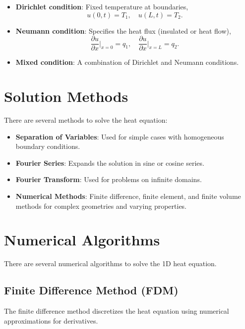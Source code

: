 \begin{itemize}
    \item \textbf{Dirichlet condition}: Fixed temperature at boundaries,
    \begin{equation}
        u(0, t) = T_1, \quad u(L, t) = T_2.
    \end{equation}
    
    \item \textbf{Neumann condition}: Specifies the heat flux (insulated or heat flow),
    \begin{equation}
        \frac{\partial u}{\partial x} \bigg|_{x=0} = q_1, \quad \frac{\partial u}{\partial x} \bigg|_{x=L} = q_2.
    \end{equation}
    
    \item \textbf{Mixed condition}: A combination of Dirichlet and Neumann conditions.
\end{itemize}

\section{Solution Methods}
There are several methods to solve the heat equation:
\begin{itemize}
    \item \textbf{Separation of Variables}: Used for simple cases with homogeneous boundary conditions.
    \item \textbf{Fourier Series}: Expands the solution in sine or cosine series.
    \item \textbf{Fourier Transform}: Used for problems on infinite domains.
    \item \textbf{Numerical Methods}: Finite difference, finite element, and finite volume methods for complex geometries and varying properties.
\end{itemize}




\section{Numerical Algorithms}
There are several numerical algorithms to solve the 1D heat equation.

\subsection{Finite Difference Method (FDM)}
The finite difference method discretizes the heat equation using numerical approximations for derivatives.

